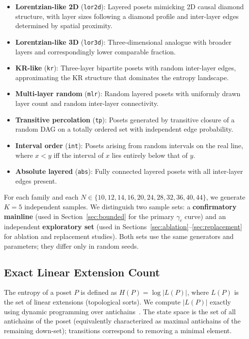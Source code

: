 \documentclass[entropy,article,submit,pdftex,moreauthors]{Definitions/mdpi}
\begin{document}
\begin{itemize}[nosep]
    \item \textbf{Lorentzian-like 2D} (\texttt{lor2d}): Layered posets mimicking 2D causal diamond structure, with layer sizes following a diamond profile and inter-layer edges determined by spatial proximity.
    \item \textbf{Lorentzian-like 3D} (\texttt{lor3d}): Three-dimensional analogue with broader layers and correspondingly lower comparable fraction.
    \item \textbf{KR-like} (\texttt{kr}): Three-layer bipartite posets with random inter-layer edges, approximating the KR structure that dominates the entropy landscape.
    \item \textbf{Multi-layer random} (\texttt{mlr}): Random layered posets with uniformly drawn layer count and random inter-layer connectivity.
    \item \textbf{Transitive percolation} (\texttt{tp}): Posets generated by transitive closure of a random DAG on a totally ordered set with independent edge probability.
    \item \textbf{Interval order} (\texttt{int}): Posets arising from random intervals on the real line, where $x < y$ iff the interval of $x$ lies entirely below that of $y$.
    \item \textbf{Absolute layered} (\texttt{abs}): Fully connected layered posets with all inter-layer edges present.
\end{itemize}

For each family and each $N \in \{10, 12, 14, 16, 20, 24, 28, 32, 36, 40, 44\}$, we generate $K = 5$ independent samples. We distinguish two sample sets: a \textbf{confirmatory mainline} (used in Section~\ref{sec:bounded} for the primary $\gamma_c$ curve) and an independent \textbf{exploratory set} (used in Sections~\ref{sec:ablation}--\ref{sec:replacement} for ablation and replacement studies). Both sets use the same generators and parameters; they differ only in random seeds.

\subsection{Exact Linear Extension Count}

The entropy of a poset $P$ is defined as $H(P) = \log |L(P)|$, where $L(P)$ is the set of linear extensions (topological sorts). We compute $|L(P)|$ exactly using dynamic programming over antichains~\cite{brightwell1991}. The state space is the set of all antichains of the poset (equivalently characterized as maximal antichains of the remaining down-set); transitions correspond to removing a minimal element.
\end{document}

